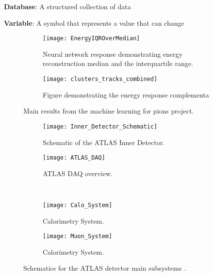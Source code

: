 \documentclass[12pt]{article}
\newcommand{\term}[2]{\textbf{#1}: #2}
\begin{document}
\term{Database}{A structured collection of data}

\term{Variable}{A symbol that represents a value that can change}

\begin{figure}[t]
    \centering
    \begin{subfigure}[t]{.48\textwidth}
        \centering
        \texttt{[image: EnergyIQROverMedian]}
        \caption{Neural network response demonstrating energy reconstruction
        median and the interquartile range.}
        \label{sufig:ml4p_energy_response}
    \end{subfigure}
    \hfill
    \begin{subfigure}[t]{.48\textwidth}
        \centering
        \texttt{[image: clusters\_tracks\_combined]}
        \caption{Figure demonstrating the energy response complementa}
        \label{subfig:complimentarity}
    \end{subfigure}
\caption{Main results from the machine learning for pions project.}
\label{fig:ml4p_main_results.}
\end{figure}
\begin{figure}[t]
    \centering
    \begin{subfigure}[t]{.48\textwidth}
        \centering
        \texttt{[image: Inner\_Detector\_Schematic]}
        \caption{Schematic of the ATLAS Inner Detector.}
        \label{subfig:inner_detector_schematic}
    \end{subfigure}
    \hfill
    \begin{subfigure}[t]{.48\textwidth}
        \centering
        \texttt{[image: ATLAS\_DAQ]}
        \caption{ATLAS DAQ overview.}
        \label{subfig:daq_schematic}
    \end{subfigure}
    ~
    \centering
    \begin{subfigure}[t]{.48\textwidth}
        \centering
        \texttt{[image: Calo\_System]}
        \caption{Calorimetry System.}
        \label{subfig:calo_schematic}
    \end{subfigure}
    \hfill
    \begin{subfigure}[t]{.48\textwidth}
        \centering
        \texttt{[image: Muon\_System]}
        \caption{Calorimetry System.}
        \label{subfig:muon_system_schematic}
    \end{subfigure}
\caption{Schematics for the ATLAS detector main subsystems \cite{Aad_2024}.}
\label{fig:ATLAS_Schematics}
\end{figure}
\end{document}
